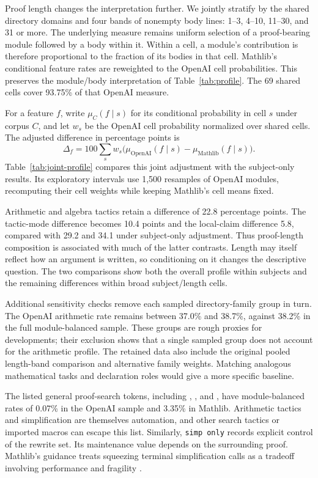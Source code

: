 

Proof length changes the interpretation further. We jointly stratify by
the shared directory domains and four bands of nonempty body lines:
1--3, 4--10, 11--30, and 31 or more. The underlying measure remains
uniform selection of a proof-bearing module followed by a body within
it. Within a cell, a module's contribution is therefore proportional to
the fraction of its bodies in that cell. Mathlib's conditional feature
rates are reweighted to the OpenAI cell probabilities. This preserves
the module/body interpretation of Table~\ref{tab:profile}. The 69 shared
cells cover 93.75\% of that OpenAI measure.

For a feature $f$, write $\mu_C(f\mid s)$ for its conditional probability
in cell $s$ under corpus $C$, and let $w_s$ be the OpenAI cell probability
normalized over shared cells. The adjusted difference in percentage
points is
\[
  \Delta_f=100\sum_s w_s
  \bigl(\mu_{\mathrm{OpenAI}}(f\mid s)
       -\mu_{\mathrm{Mathlib}}(f\mid s)\bigr).
\]
Table~\ref{tab:joint-profile} compares this joint adjustment with the
subject-only results. Its exploratory intervals use 1,500 resamples of
OpenAI modules, recomputing their cell weights while keeping Mathlib's
cell means fixed.



Arithmetic and algebra tactics retain a difference of 22.8 percentage
points. The tactic-mode difference becomes 10.4 points and the
local-claim difference 5.8, compared with 29.2 and 34.1 under subject-only
adjustment. Thus proof-length composition is associated with much of
the latter contrasts. Length may itself reflect how an argument is
written, so conditioning on it changes the descriptive question.
The two comparisons show both the overall profile within subjects and
the remaining differences within broad subject/length cells.

Additional sensitivity checks remove each sampled directory-family group
in turn. The OpenAI arithmetic rate remains between 37.0\% and 38.7\%,
against 38.2\% in the full module-balanced sample. These groups are rough
proxies for developments; their exclusion shows that a single sampled
group does not account for the arithmetic profile. The retained data
also include the original pooled length-band comparison and alternative
family weights. Matching analogous mathematical tasks and declaration
roles would give a more specific baseline.

The listed general proof-search tokens, including ,
, and , have module-balanced rates of
0.07\% in the OpenAI sample and 3.35\% in Mathlib. Arithmetic tactics and simplification are themselves
automation, and other search tactics or imported macros can escape this
list. Similarly, \texttt{simp only} records explicit control of the rewrite
set. Its maintenance value depends on the surrounding proof. Mathlib's
guidance treats squeezing terminal simplification calls as a tradeoff
involving performance and fragility \citep{MathlibStyle}.

